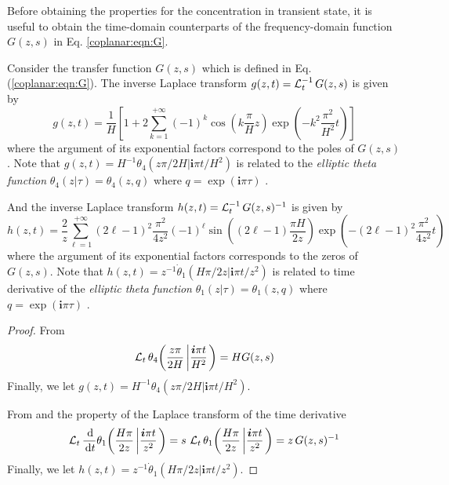 Before obtaining the properties for the concentration in transient state,
it is useful to obtain the time-domain counterparts of the frequency-domain function $G(z,s)$ in Eq. \eqref{coplanar:eqn:G}.
\begin{lema}
	\label{coplanar:lem:g-h}
	Consider the transfer function $G(z,s)$
	which is defined in Eq. (\ref{coplanar:eqn:G}).
	The inverse Laplace transform $g(z,t) = \operatorname{\mathcal{L}}_{t}^{-1} G(z,s)$
	is given by
	\begin{equation}
		\label{coplanar:eqn:g}
		g(z,t)
		= \frac{1}{H}
		\left[
			1 + 2 \sum_{k=1}^{+\infty} (-1)^{k}
			\cos\!\left( k \frac{\pi}{H} z \right)
			\exp\!\left( -k^{2} \frac{\pi^{2}}{H^{2}} t \right)
		\right]
	\end{equation}
	where the argument of its exponential factors correspond to the poles of $G(z,s)$.
	Note that $g(z,t) = H^{-1} \theta_{4}(z\pi/2H|\bm{i}\pi t/H^{2})$ 
	 is related to the \emph{elliptic theta function}
	$\theta_{4}(z|\tau) = \theta_{4}(z,q)$ 
	where $q = \exp(\bm{i}\pi\tau)$ \cite[\S{}]{dlmf}.

	And the inverse Laplace transform $h(z,t) = \operatorname{\mathcal{L}}_{t}^{-1} G(z,s)^{-1}$ is given by
	\begin{equation}
		\label{coplanar:eqn:h}
		h(z,t) =
		\frac{2}{z} \sum_{\ell=1}^{+\infty} (2\ell - 1)^{2} \frac{\pi^{2}}{4 z^{2}} (-1)^{\ell}
		\sin\!\left( (2\ell - 1) \frac{\pi H}{2z} \right)
		\exp\!\left( -(2\ell - 1)^{2} \frac{\pi^{2}}{4 z^{2}} t \right)
	\end{equation}
	where the argument of its exponential factors corresponds to the zeros of $G(z,s)$.
	Note that $h(z,t) = z^{-1} \dot{\theta}_{1}(H\pi/2z|\bm{i}\pi t/z^{2})$
	is related to time derivative of the \emph{elliptic theta function}
	$\theta_{1}(z|\tau) = \theta_{1}(z,q)$ 
	where $q = \exp(\bm{i}\pi\tau)$ \cite[\S{}]{dlmf}.
\end{lema}

\begin{proof}
	From 
	\begin{equation}
		\operatorname{\mathcal{L}}_{t} \theta_{4}\!\left( \frac{z\pi}{2H} \left| \frac{\bm{i}\pi t}{H^{2}} \right. \right)
		= H G(z,s)
	\end{equation}
	Finally, we let $g(z,t) = H^{-1} \theta_{4}(z\pi/2H|\bm{i}\pi t/H^{2})$.
	
	From  and
	the property of the Laplace transform of the time derivative
	\begin{equation}
		\laplace \deriv{}{t} \theta_{1}\!\left( \frac{H\pi}{2z} \left| \frac{\bm{i}\pi t}{z^{2}} \right. \right)
		= s\, \laplace \theta_{1}\!\left( \frac{H\pi}{2z} \left| \frac{\bm{i}\pi t}{z^{2}} \right. \right)
		= z\, G(z,s)^{-1}
	\end{equation}
	Finally, we let $h(z,t) = z^{-1} \dot{\theta}_{1}(H\pi/2z|\bm{i}\pi t/z^{2})$.
\end{proof}

